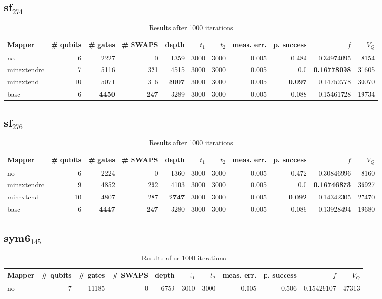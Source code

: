 \documentclass[11pt]{article}
\begin{document}
\subsection{sf\(_{\text{274}}\)}
\label{sec:org42292ef}
\begin{table}[H]
\caption{\label{tab:org7a6b7e7}
Results after 1000 iterations}
\centering
\small
\begin{tabular}{lrrrrrrrrrr}
\hline
Mapper & \# qubits & \# gates & \# SWAPS & depth & \(t_1\) & \(t_2\) & meas. err. & p. success & \(f\) & \(V_Q\)\\
\hline
no & 6 & 2227 & 0 & 1359 & 3000 & 3000 & 0.005 & 0.484 & 0.34974095 & 8154\\
\hline
minextendrc & 7 & 5116 & 321 & 4515 & 3000 & 3000 & 0.005 & 0.0 & \textbf{0.16778098} & 31605\\
minextend & 10 & 5071 & 316 & \textbf{3007} & 3000 & 3000 & 0.005 & \textbf{0.097} & 0.14752778 & 30070\\
base & 6 & \textbf{4450} & \textbf{247} & 3289 & 3000 & 3000 & 0.005 & 0.088 & 0.15461728 & 19734\\
\hline
\end{tabular}
\end{table}
\subsection{sf\(_{\text{276}}\)}
\label{sec:orgea6cd1d}
\begin{table}[H]
\caption{\label{tab:orgcba822a}
Results after 1000 iterations}
\centering
\small
\begin{tabular}{lrrrrrrrrrr}
\hline
Mapper & \# qubits & \# gates & \# SWAPS & depth & \(t_1\) & \(t_2\) & meas. err. & p. success & \(f\) & \(V_Q\)\\
\hline
no & 6 & 2224 & 0 & 1360 & 3000 & 3000 & 0.005 & 0.472 & 0.30846996 & 8160\\
\hline
minextendrc & 9 & 4852 & 292 & 4103 & 3000 & 3000 & 0.005 & 0.0 & \textbf{0.16746873} & 36927\\
minextend & 10 & 4807 & 287 & \textbf{2747} & 3000 & 3000 & 0.005 & \textbf{0.092} & 0.14342305 & 27470\\
base & 6 & \textbf{4447} & \textbf{247} & 3280 & 3000 & 3000 & 0.005 & 0.089 & 0.13928494 & 19680\\
\hline
\end{tabular}
\end{table}
\subsection{sym6\(_{\text{145}}\)}
\label{sec:org75d58ec}
\begin{table}[H]
\caption{\label{tab:org5254b2f}
Results after 1000 iterations}
\centering
\small
\begin{tabular}{lrrrrrrrrrr}
\hline
Mapper & \# qubits & \# gates & \# SWAPS & depth & \(t_1\) & \(t_2\) & meas. err. & p. success & \(f\) & \(V_Q\)\\
\hline
no & 7 & 11185 & 0 & 6759 & 3000 & 3000 & 0.005 & 0.506 & 0.15429107 & 47313\\
\hline
\end{tabular}
\end{table}
\end{document}
